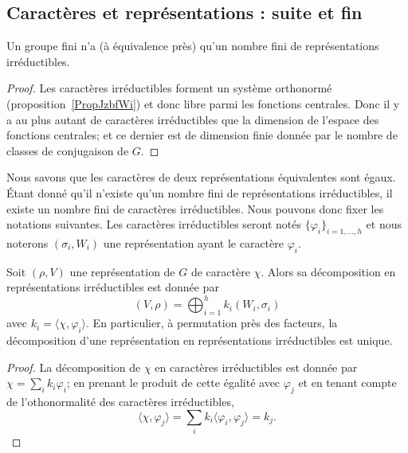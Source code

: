 \subsection{Caractères et représentations : suite et fin}

\begin{lemma}
	Un groupe fini n'a (à équivalence près) qu'un nombre fini de représentations irréductibles.
\end{lemma}

\begin{proof}
	Les caractères irréductibles forment un système orthonormé (proposition~\ref{PropJzbfWi}) et donc libre parmi les fonctions centrales. Donc il y a au plus autant de caractères irréductibles que la dimension de l'espace des fonctions centrales; et ce dernier est de dimension finie donnée par le nombre de classes de conjugaison de \( G\).
\end{proof}

Nous savons que les caractères de deux représentations équivalentes sont égaux. Étant donné qu'il n'existe qu'un nombre fini de représentations irréductibles, il existe un nombre fini de caractères irréductibles. Nous pouvons donc fixer les notations suivantes. Les caractères irréductibles seront notés \( \{ \varphi_i \}_{i=1,\ldots, h}\) et nous noterons \( (\sigma_i,W_i)\) une représentation ayant le caractère \( \varphi_i\).

\begin{theorem}
	Soit \( (\rho,V)\) une représentation de \( G\) de caractère \( \chi\). Alors sa décomposition en représentations irréductibles est donnée par
	\begin{equation}
		(V,\rho)=\bigoplus_{i=1}^hk_i(W_i,\sigma_i)
	\end{equation}
	avec \( k_i=\langle \chi, \varphi_i\rangle \). En particulier, à permutation près des facteurs, la décomposition d'une représentation en représentations irréductibles est unique.
\end{theorem}

\begin{proof}
	La décomposition de \( \chi\) en caractères irréductibles est donnée par \( \chi=\sum_ik_i\varphi_i\); en prenant le produit de cette égalité avec \( \varphi_j\) et en tenant compte de l'othonormalité des caractères irréductibles,
	\begin{equation}
		\langle \chi, \varphi_j\rangle =\sum_ik_i\langle \varphi_i, \varphi_j\rangle =k_j.
	\end{equation}
\end{proof}

